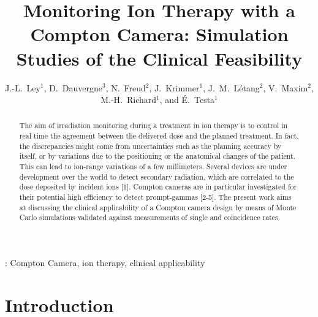 \documentclass[12pt]{iopart}
\begin{document}
\title{Monitoring Ion Therapy with a Compton Camera: Simulation Studies of the Clinical Feasibility}

\author{J.-L.~Ley$^1$, D.~Dauvergne$^3$, N.~Freud$^2$, J.~Krimmer$^1$, J.~M.~L\'etang$^2$, V.~Maxim$^2$, M.-H.~Richard$^1$, and \'E.~Testa$^1$}

\address{$^1$Univ Lyon, Universit\'e Claude Bernard Lyon 1, CNRS/IN2P3, Institut de Physique Nucl\'eaire de Lyon, 69622 Villeurbanne, France}
\address{$^2$Univ Lyon, INSA-Lyon, Universit\'e Claude Bernard Lyon 1, UJM-Saint \'Etienne, CNRS, Inserm, Centre L\'eon B\'erard, CREATIS UMR 5220 U1206, F-69373, Lyon, France}
\address{$^3$LPSC, Universit\'e Grenoble-Alpes, CNRS/IN2P3 UMR5821, F-38026 Grenoble, France}

\begin{abstract}
The aim of irradiation monitoring during a treatment in ion therapy is to control in real time the agreement between the delivered dose and the planned treatment. In fact, the discrepancies might come from uncertainties such as the planning accuracy by itself, or by variations due to the positioning or the anatomical changes of the patient. This can lead to ion-range variations of a few millimeters. Several devices are under development over the world to detect secondary radiation, which are correlated to the dose deposited by incident ions [1]. Compton cameras are in particular investigated for their potential high efficiency to detect prompt-gammas [2-5]. The present work aims at discussing the clinical applicability of a Compton camera design by means of Monte Carlo simulations validated against measurements of single and coincidence rates.

\end{abstract}


\submitto{\PMB}
\vspace{2pc}
: Compton Camera, ion therapy, clinical applicability
\maketitle
%
\newpage

\tableofcontents


\section{Introduction}
\end{document}

